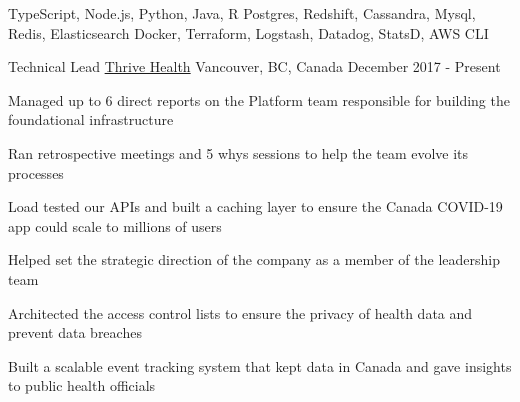 \begin{cvskills}
   {TypeScript, Node.js, Python, Java, R}
   {Postgres, Redshift, Cassandra, Mysql, Redis, Elasticsearch}
   {Docker, Terraform, Logstash, Datadog, StatsD, AWS CLI}
\end{cvskills}




\begin{cventries}

  \cventry
    {Technical Lead} %
    {\href{https://www.thrive.health}{Thrive Health}} %
    {Vancouver, BC, Canada} %
    {December 2017 - Present} %
    {
      \begin{cvitems} %
        \item {Managed up to 6 direct reports on the Platform team responsible for building the foundational infrastructure}
        \item {Ran retrospective meetings and 5 whys sessions to help the team evolve its processes}
        \item {Load tested our APIs and built a caching layer to ensure the Canada COVID-19 app could scale to millions of users}
        \item {Helped set the strategic direction of the company as a member of the leadership team}
        \item {Architected the access control lists to ensure the privacy of health data and prevent data breaches}
        \item {Built a scalable event tracking system that kept data in Canada and gave insights to public health officials}
      \end{cvitems}
    }



\end{cventries}
